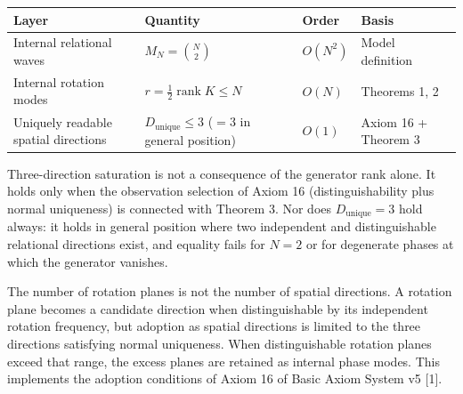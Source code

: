 \documentclass[
  a4paper,
]{article}
\newcounter{none} %
\begin{document}
{\def\LTcaptype{none} %
\begin{longtable}[]{@{}
  >{\raggedright\arraybackslash}p{}
  >{\raggedright\arraybackslash}p{}
  >{\raggedright\arraybackslash}p{}
  >{\raggedright\arraybackslash}p{}@{}}
\toprule\noalign{}
\begin{minipage}[b]{\linewidth}\raggedright
Layer
\end{minipage} & \begin{minipage}[b]{\linewidth}\raggedright
Quantity
\end{minipage} & \begin{minipage}[b]{\linewidth}\raggedright
Order
\end{minipage} & \begin{minipage}[b]{\linewidth}\raggedright
Basis
\end{minipage} \\
\midrule\noalign{}
\endhead
\bottomrule\noalign{}
\endlastfoot
Internal relational waves & \(M_N=\binom{N}{2}\) & \(O(N^2)\) & Model
definition \\
Internal rotation modes & \(r=\frac12\operatorname{rank}K\le N\) &
\(O(N)\) & Theorems 1, 2 \\
Uniquely readable spatial directions & \(D_{\mathrm{unique}}\le3\)
(\(=3\) in general position) & \(O(1)\) & Axiom 16 + Theorem 3 \\
\end{longtable}
}

Three-direction saturation is not a consequence of the generator rank
alone. It holds only when the observation selection of Axiom 16
(distinguishability plus normal uniqueness) is connected with Theorem 3.
Nor does \(D_{\mathrm{unique}}=3\) hold always: it holds in general
position where two independent and distinguishable relational directions
exist, and equality fails for \(N=2\) or for degenerate phases at which
the generator vanishes.

The number of rotation planes is not the number of spatial directions. A
rotation plane becomes a candidate direction when distinguishable by its
independent rotation frequency, but adoption as spatial directions is
limited to the three directions satisfying normal uniqueness. When
distinguishable rotation planes exceed that range, the excess planes are
retained as internal phase modes. This implements the adoption
conditions of Axiom 16 of Basic Axiom System v5 {[}1{]}.
\end{document}
